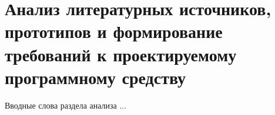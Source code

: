\section{Анализ литературных источников, прототипов и формирование требований к проектируемому программному средству}
\label{sec:analysis}

Вводные слова раздела анализа
...






